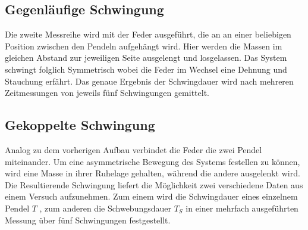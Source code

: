 \subsection{Gegenläufige Schwingung}
Die zweite Messreihe wird mit der Feder ausgeführt, die an an einer beliebigen Position zwischen den Pendeln aufgehängt wird.
Hier werden die Massen im gleichen Abstand zur jeweiligen Seite ausgelengt und losgelassen. Das System schwingt
folglich Symmetrisch wobei die Feder im Wechsel eine Dehnung und Stauchung erfährt.
Das genaue Ergebnis der Schwingdauer wird nach mehreren Zeitmessungen von jeweils fünf Schwingungen gemittelt.

\subsection{Gekoppelte Schwingung}
Analog zu dem vorherigen Aufbau verbindet die Feder die zwei Pendel miteinander. Um eine asymmetrische Bewegung des Systems 
festellen zu können, wird eine Masse in ihrer Ruhelage gehalten, während die andere ausgelenkt wird.
Die Resultierende Schwingung liefert die Möglichkeit zwei verschiedene Daten aus einem Versuch aufzunehmen.
Zum einem wird die Schwingdauer eines einzelnem Pendel $T$ , zum anderen die Schwebungsdauer $T_S$ in einer 
mehrfach ausgeführten Messung über fünf Schwingungen festgestellt.
